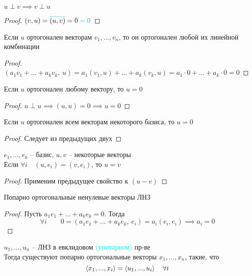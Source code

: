 \begin{props}
	\item $ u \perp v \implies v \perp u $
	\begin{proof}
		$ (v, u) = \color{cyan}\overline{\color{black}(u, v)}\color{black} = \color{cyan}\overline{\color{black}0} = 0 \color{black} $
	\end{proof}
	\item Если $ u $ ортогонален векторам $ v_1, ..., v_n $, то он ортогонален любой их линейной комбинации
	\begin{proof}
		$ (a_1v_1 + ... + a_kv_k, ~ u) = a_1(v_1, u) + ... + a_k(v_k, u) = a_1 \cdot 0 + ... + a_k \cdot 0 = 0 $
	\end{proof}
	\item Если $ u $ ортогонален любому вектору, то $ u = 0 $
	\begin{proof}
		$ u \perp u \implies (u, u) = 0 \implies u = 0 $
	\end{proof}
	\item Если $ u $ ортогонален всем векторам некоторого базиса, то $ u = 0 $
	\begin{proof}
		Следует из предыдущих двух
	\end{proof}
	\item $ e_1, ..., e_k $ -- базис, $ u, v $ -- некоторые векторы \\
	Если $ \forall i \quad (u, e_i) = (v, e_i) $, то $ u = v $
	\begin{proof}
		Применим предыдущее свойство к $ (u - v) $
	\end{proof}
	\item Попарно ортогональные ненулевые векторы ЛНЗ
	\begin{proof}
		Пусть $ a_1e_1 + ... + a_ke_k = 0 $. Тогда
		$$ \forall i \qquad 0 = (a_1e_1 + ... + a_ke_k, ~ e_i) = a_i(e_i, e_i) \implies a_i = 0 $$
	\end{proof}
\end{props}

\begin{theorem}
	$ u_1, ..., u_n $ -- ЛНЗ в евклидовом \textcolor{cyan}{(унитарном)} пр-ве \\
	Тогда существуют попарно ортогональные векторы $ x_1, ..., x_n $, такие, что
	$$ \braket{x_1, ..., x_i} = \braket{u_1, ..., u_i} \quad \forall i $$
\end{theorem}


